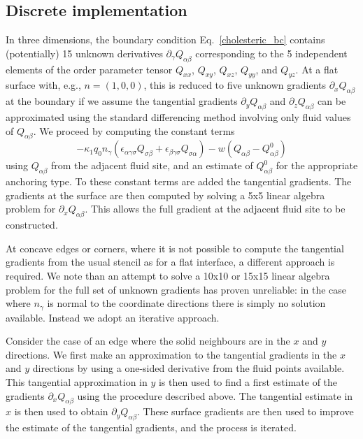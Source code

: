 \subsection{Discrete implementation}

In three dimensions, the boundary condition Eq.~\ref{cholesteric_bc}
contains (potentially) 15 unknown derivatives
$\partial_\gamma Q_{\alpha\beta}$
corresponding to the 5 independent elements of the order parameter
tensor $Q_{xx}$, $Q_{xy}$, $Q_{xz}$, $Q_{yy}$, and $Q_{yz}$. At a
flat surface with, e.g., $n = (1, 0, 0)$, this is reduced to five unknown
gradients $\partial_x Q_{\alpha\beta}$ at the
boundary if we assume the tangential gradients $\partial_y Q_{\alpha\beta}$
and $\partial_z Q_{\alpha\beta}$ can be approximated
using the standard differencing method involving only fluid values of
$Q_{\alpha\beta}$. We proceed by
computing the constant terms
$$
- \kappa_1 q_0 n_\gamma (\epsilon_{\alpha\gamma\sigma} Q_{\sigma\beta}
+ \epsilon_{\beta\gamma\sigma}Q_{\sigma\alpha})
- w(Q_{\alpha\beta} - Q_{\alpha\beta}^0)
$$
using $Q_{\alpha\beta}$ from the adjacent fluid site, and an estimate
of $Q^0_{\alpha\beta}$ for the appropriate anchoring type. To these
constant terms are added the tangential gradients.
The gradients at the surface are then computed by solving a 5x5
linear algebra problem for $\partial_x Q_{\alpha\beta}$. This
allows the full gradient at the adjacent fluid site to be constructed.

At concave edges or corners, where it is not possible to compute the
tangential gradients from the usual stencil as for a flat interface,
a different approach is required. We note than an attempt to solve a
10x10 or 15x15 linear algebra problem for the full set of unknown
gradients has proven unreliable: in the case where $n_\gamma$ is
normal to the coordinate directions there is simply no solution
available. Instead we adopt an iterative approach.

Consider the case of an edge where the solid neighbours
are in the $x$ and $y$ directions.  We first make an approximation
to the tangential gradients in the $x$ and $y$ directions by using
a one-sided derivative from the fluid points available. This
tangential approximation in $y$ is then used to find a first
estimate of the gradients $\partial_x Q_{\alpha\beta}$ using the
procedure described above. The tangential estimate in $x$ is then
used to obtain $\partial_y Q_{\alpha\beta}$. These surface gradients
are then used to improve the estimate of the tangential gradients,
and the process is iterated.

